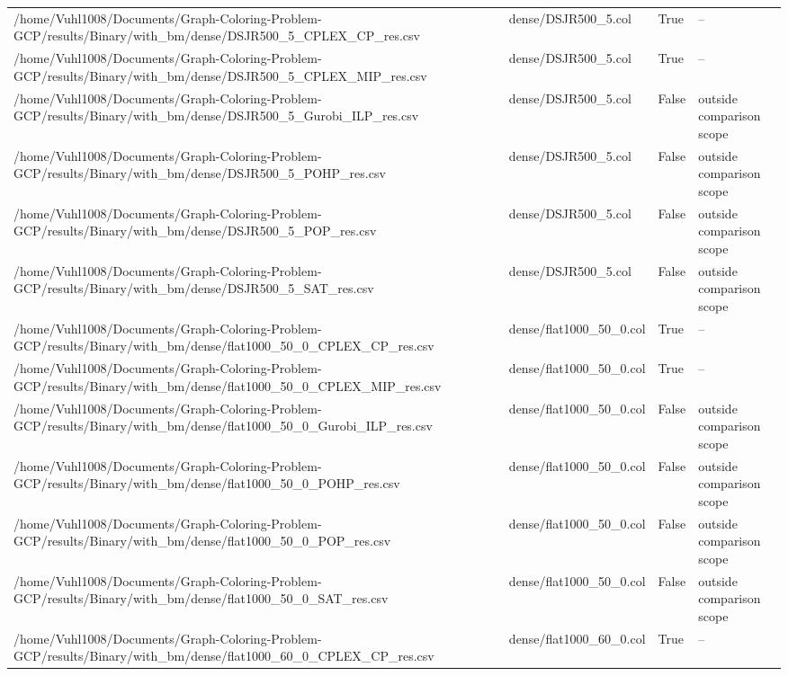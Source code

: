 \begin{table}[htbp]
\begin{tabular}{llll}
/home/Vuhl1008/Documents/Graph-Coloring-Problem-GCP/results/Binary/with\_bm/dense/DSJR500\_5\_CPLEX\_CP\_res.csv & dense/DSJR500\_5.col & True & -- \\
/home/Vuhl1008/Documents/Graph-Coloring-Problem-GCP/results/Binary/with\_bm/dense/DSJR500\_5\_CPLEX\_MIP\_res.csv & dense/DSJR500\_5.col & True & -- \\
/home/Vuhl1008/Documents/Graph-Coloring-Problem-GCP/results/Binary/with\_bm/dense/DSJR500\_5\_Gurobi\_ILP\_res.csv & dense/DSJR500\_5.col & False & outside comparison scope \\
/home/Vuhl1008/Documents/Graph-Coloring-Problem-GCP/results/Binary/with\_bm/dense/DSJR500\_5\_POHP\_res.csv & dense/DSJR500\_5.col & False & outside comparison scope \\
/home/Vuhl1008/Documents/Graph-Coloring-Problem-GCP/results/Binary/with\_bm/dense/DSJR500\_5\_POP\_res.csv & dense/DSJR500\_5.col & False & outside comparison scope \\
/home/Vuhl1008/Documents/Graph-Coloring-Problem-GCP/results/Binary/with\_bm/dense/DSJR500\_5\_SAT\_res.csv & dense/DSJR500\_5.col & False & outside comparison scope \\
/home/Vuhl1008/Documents/Graph-Coloring-Problem-GCP/results/Binary/with\_bm/dense/flat1000\_50\_0\_CPLEX\_CP\_res.csv & dense/flat1000\_50\_0.col & True & -- \\
/home/Vuhl1008/Documents/Graph-Coloring-Problem-GCP/results/Binary/with\_bm/dense/flat1000\_50\_0\_CPLEX\_MIP\_res.csv & dense/flat1000\_50\_0.col & True & -- \\
/home/Vuhl1008/Documents/Graph-Coloring-Problem-GCP/results/Binary/with\_bm/dense/flat1000\_50\_0\_Gurobi\_ILP\_res.csv & dense/flat1000\_50\_0.col & False & outside comparison scope \\
/home/Vuhl1008/Documents/Graph-Coloring-Problem-GCP/results/Binary/with\_bm/dense/flat1000\_50\_0\_POHP\_res.csv & dense/flat1000\_50\_0.col & False & outside comparison scope \\
/home/Vuhl1008/Documents/Graph-Coloring-Problem-GCP/results/Binary/with\_bm/dense/flat1000\_50\_0\_POP\_res.csv & dense/flat1000\_50\_0.col & False & outside comparison scope \\
/home/Vuhl1008/Documents/Graph-Coloring-Problem-GCP/results/Binary/with\_bm/dense/flat1000\_50\_0\_SAT\_res.csv & dense/flat1000\_50\_0.col & False & outside comparison scope \\
/home/Vuhl1008/Documents/Graph-Coloring-Problem-GCP/results/Binary/with\_bm/dense/flat1000\_60\_0\_CPLEX\_CP\_res.csv & dense/flat1000\_60\_0.col & True & -- \\

\end{tabular}
\end{table}
